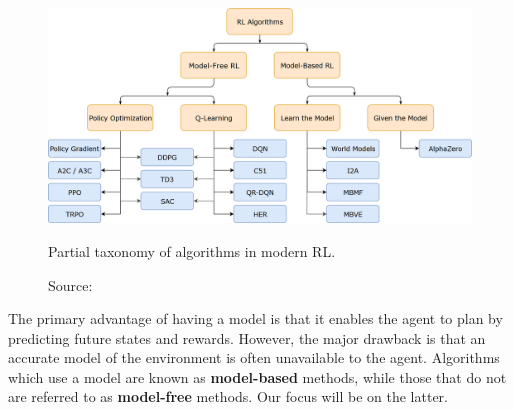 \begin{figure}[h]
    \centering
    \includegraphics[width=.8\textwidth]{figures/ch3/4.rlalg.png}
    \caption{Partial taxonomy of algorithms in modern RL.}
    \vspace{-10px}
    \caption*{\scriptsize{Source: \cite{openaiPartKinds}}}
    \label{fig:mdp}
\end{figure}

The primary advantage of having a model is that it enables the agent
to plan by predicting future states and rewards.
However, the major drawback is that an accurate model of the environment
is often unavailable to the agent.
Algorithms which use a model are known as \textbf{model-based} methods,
while those that do not are referred to as \textbf{model-free} methods.
Our focus will be on the latter.

